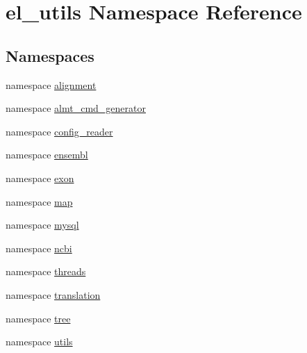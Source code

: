 \hypertarget{namespaceel__utils}{\section{el\-\_\-utils Namespace Reference}
\label{namespaceel__utils}
}
\subsection*{Namespaces}
\begin{DoxyCompactItemize}
\item 
namespace \hyperlink{namespaceel__utils_1_1alignment}{alignment}
\item 
namespace \hyperlink{namespaceel__utils_1_1almt__cmd__generator}{almt\-\_\-cmd\-\_\-generator}
\item 
namespace \hyperlink{namespaceel__utils_1_1config__reader}{config\-\_\-reader}
\item 
namespace \hyperlink{namespaceel__utils_1_1ensembl}{ensembl}
\item 
namespace \hyperlink{namespaceel__utils_1_1exon}{exon}
\item 
namespace \hyperlink{namespaceel__utils_1_1map}{map}
\item 
namespace \hyperlink{namespaceel__utils_1_1mysql}{mysql}
\item 
namespace \hyperlink{namespaceel__utils_1_1ncbi}{ncbi}
\item 
namespace \hyperlink{namespaceel__utils_1_1threads}{threads}
\item 
namespace \hyperlink{namespaceel__utils_1_1translation}{translation}
\item 
namespace \hyperlink{namespaceel__utils_1_1tree}{tree}
\item 
namespace \hyperlink{namespaceel__utils_1_1utils}{utils}
\end{DoxyCompactItemize}
